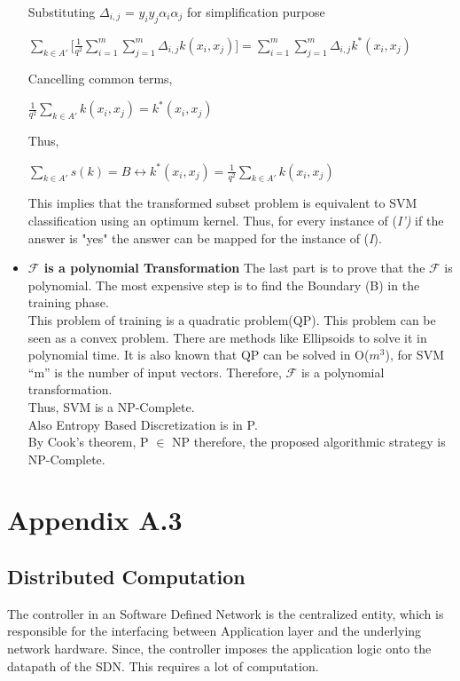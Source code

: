 \documentclass[12pt,a4paper,final]{report}
\DeclareRobustCommand{\gobblefive}[5]{}
\newcommand*{\SkipTocEntry}{\addtocontents{toc}{\gobblefive}}
\begin{document}
\begin{itemize}
\begin{center}
\end{center}
Substituting $\Delta_{i,j}$ = $y_iy_j\alpha_i\alpha_j$ for simplification purpose \\
\begin{center}
$\sum_{k \in A'}\Big[\frac{1}{q^2}\sum_{i=1}^{m}\sum_{j=1}^{m}\Delta_{i,j}k(x_i,x_j)\Big] = \sum_{i=1}^{m}\sum_{j=1}^{m}\Delta_{i,j}k^*(x_i,x_j)$
\end{center}
Cancelling common terms,
\begin{center}
$\frac{1}{q^2}\sum_{k \in A'}{}k(x_i,x_j)=k^*(x_i,x_j)$
\end{center}
Thus, 
\begin{center}
$\sum_{k \in A'}s(k) = B \leftrightarrow k^*(x_i,x_j) = \frac{1}{q^2}\sum_{k \in A'}k(x_i,x_j)$
\end{center}
This implies that the transformed subset problem is equivalent to SVM classification using an optimum kernel. Thus, for every instance of (\emph{I')} if the answer is "yes" the answer can be mapped for the instance  of (\emph{I}). \\
\item
\textbf{$\mathcal{F}$ is a polynomial Transformation}
\newline The last part is to prove that the $\mathcal{F}$ is polynomial. The most expensive step is to find the Boundary (B) in the training phase.\\
This problem of training is a quadratic problem(QP). This problem can be seen as a convex problem. There are methods like Ellipsoids to solve it in polynomial time. 
It is also known that QP can be solved in O($m^3$), for  SVM ``m'' is the number of input vectors. Therefore, $\mathcal{F}$ is a polynomial transformation. \\
\newline Thus, SVM is a NP-Complete.\\
Also Entropy Based Discretization is in P.\\
By Cook's theorem, P $\in$ NP therefore, the proposed algorithmic strategy is NP-Complete.  

\end{itemize}

\newpage
\SkipTocEntry\section{Appendix A.3}
\SkipTocEntry\subsection{Distributed Computation}
The controller in an Software Defined Network is the centralized entity, which is responsible for the interfacing between Application layer and the underlying network hardware. Since, the controller imposes the application logic onto the datapath of the SDN. This requires a lot of computation. \\
\end{document}

